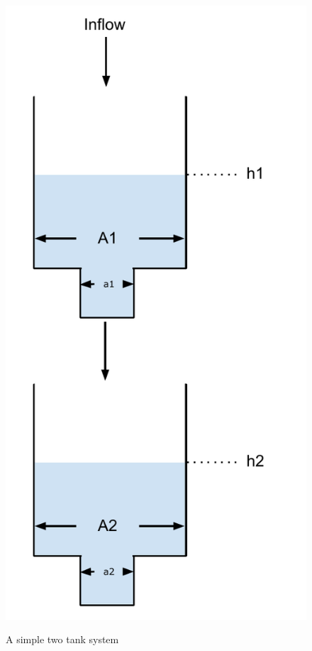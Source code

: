 \begin{figure}

\includegraphics[scale=0.4,bb=0 0 3.67in 7.47in] {Figures/TwoTankSystem.pdf}\\\newline
\caption{A simple two tank system}
\label{fig:twotank}
\end{figure}
